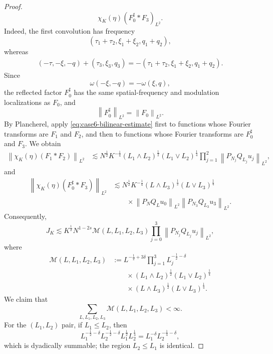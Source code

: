 \documentclass[12pt,oneside,reqno]{amsart}
\numberwithin{equation}{section}
\theoremstyle{plain}
\newcommand{\norm}[1]{%
    \left\lVert #1\right\rVert%
}
\newcommand{\Lpn}[2]{%
    \left\lVert #1\right\rVert_{L^{#2}}%
}
\begin{document}
\begin{proof}
\begin{equation}
{    \chi_K(\eta)(F_0^\sharp*F_3)
}_{L^2}.
\label{eq:case6-paired-bound}
\end{equation}
Indeed, the first convolution has frequency
\begin{equation}
    (\tau_1+\tau_2,\xi_1+\xi_2,q_1+q_2),
\end{equation}
whereas
\begin{equation}
\begin{aligned}
(-\tau,-\xi,-q)
+
(\tau_3,\xi_3,q_3)
=
-(\tau_1+\tau_2,\xi_1+\xi_2,q_1+q_2).
\end{aligned}
\end{equation}
Since
\begin{equation}
    \omega(-\xi,-q)
    =
    -\omega(\xi,q),
\end{equation}
the reflected factor $F_0^\sharp$ has the same spatial-frequency and
modulation localizations as $F_0$, and
\begin{equation}
    \norm{F_0^\sharp}_{L^2}
    =
    \norm{F_0}_{L^2}.
\end{equation}
By Plancherel, apply \eqref{eq:case6-bilinear-estimate} first to functions
whose Fourier transforms are $F_1$ and $F_2$, and then to functions whose
Fourier transforms are $F_0^\sharp$ and $F_3$. We obtain
\begin{align}
\norm{
    \chi_K(\eta)(F_1*F_2)
}_{L^2}
&\lesssim
N^{\frac12}
K^{-\frac14}
(L_1\wedge L_2)^{\frac12}
(L_1\vee L_2)^{\frac14}
\prod_{j=1}^2
\Lpn{P_{N_j}Q_{L_j}u_j}{2},
\label{eq:case6-first-pair}
\end{align}
and
\begin{align}
\norm{
    \chi_K(\eta)(F_0^\sharp*F_3)
}_{L^2}
&\lesssim
N^{\frac12}
K^{-\frac14}
(L\wedge L_3)^{\frac12}
(L\vee L_3)^{\frac14}
\nonumber\\
&\qquad\times
\Lpn{P_NQ_Lu_0}{2}
\Lpn{P_{N_3}Q_{L_3}u_3}{2}.
\label{eq:case6-second-pair}
\end{align}
Consequently,
\begin{equation}
\label{eq:case6-after-bilinear}
    J_K
    \lesssim
    K^{\frac12}
    N^{1-2s}
    \mathcal M(L,L_1,L_2,L_3)
    \prod_{j=0}^3
    \Lpn{P_{N_j}Q_{L_j}u_j}{2},
\end{equation}
where
\begin{align}
\mathcal M(L,L_1,L_2,L_3)
&:=
L^{-\frac12+3\delta}
\prod_{j=1}^3
L_j^{-\frac12-\delta}
\nonumber\\
&\qquad\times
(L_1\wedge L_2)^{\frac12}
(L_1\vee L_2)^{\frac14}
\nonumber\\
&\qquad\times
(L\wedge L_3)^{\frac12}
(L\vee L_3)^{\frac14}.
\label{eq:case6-M-factor}
\end{align}
We claim that
\begin{equation}
\label{eq:case6-M-summable}
    \sum_{L,L_1,L_2,L_3}
    \mathcal M(L,L_1,L_2,L_3)
    <\infty.
\end{equation}
For the $(L_1,L_2)$ pair, if $L_1\leq L_2$, then
\begin{equation}
    L_1^{-\frac12-\delta}
    L_2^{-\frac12-\delta}
    L_1^{\frac12}
    L_2^{\frac14}
    =
    L_1^{-\delta}
    L_2^{-\frac14-\delta},
\end{equation}
which is dyadically summable; the region $L_2\leq L_1$ is
identical.


\end{proof}
\end{document}
